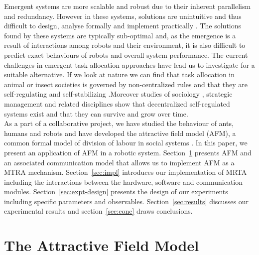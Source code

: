 \documentclass{llncs}
\begin{document}
Emergent systems are more scalable and robust due to their inherent parallelism and redundancy.
However in these systems, solutions are unintuitive and thus difficult to design, analyse formally and implement practically \cite{Gerkey+2004,Lerman+2006}.
The solutions found by these systems are typically sub-optimal and, as the emergence is a result of interactions among robots and their environment, it is also difficult to predict exact behaviours of robots and overall system performance.
The current challenges in emergent task allocation approaches have lead us to investigate for a suitable alternative.
If we look at nature we can find that task allocation in animal or insect societies is governed by non-centralized rules and that they are self-regulating and self-stabilizing \cite{Bonabeau+1999}.Moreover studies of sociology \cite{Sayer+1992}, strategic management \cite{Kogut2000} and related disciplines show that decentralized self-regulated systems exist and that they can survive and grow over time.\\
As a part of a collaborative project, we have studied the behaviour of ants, humans and robots and have developed the attractive field model (AFM), a common formal model of division of labour in social systems \cite{Elsa}.
In this paper, we present an application of AFM in a robotic system.
Section~\ref{sec:model} presents AFM and an associated communication model that allows us to implement AFM as a MTRA mechanism.
Section~\ref{sec:impl} introduces our implementation of MRTA including the interactions between the hardware, software and communication modules.
Section~\ref{sec:expt-design} presents the design of our experiments including specific parameters and observables.
Section~\ref{sec:results} discusses our experimental results and section~\ref{sec:conc} draws conclusions.
\section{The Attractive Field Model}
\label{sec:model}
\end{document}
